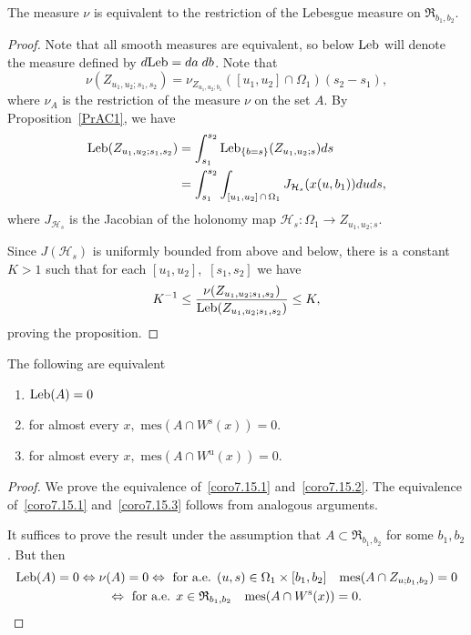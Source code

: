 \documentclass[AHL, Unicode, longabstracts,published]{cedram}
\newcommand{\inv}{^{-1}}
\newcommand{\unstable}{\text{u}}
\newcommand{\stable}{\text{s}}
\newcommand{\mes}{{\mathrm{mes}}}
\newcommand{\Rect}{{\mathfrak{R}}}
\newcommand{\hol}{\mathcal{H}}
\newcommand{\Ws}{W^{\stable}}
\newcommand{\Wu}{W^{\unstable}}
\newcommand{\Leb}{\textup{Leb}}
\newcommand*{\relabel}{\renewcommand{\labelenumi}{(\theenumi)}}
\newcommand*{\alphenumi}{\renewcommand*{\theenumi}{\alph{enumi}}\relabel}
\begin{document}
\begin{prop}\label{PrAC2}
The measure $\nu$ is equivalent to the restriction of the Lebesgue measure on $\Rect_{b_1, b_2}.$
\end{prop}
\begin{proof}
Note that all smooth measures are equivalent, so below $\Leb$ will denote the measure defined by $d\Leb=da\; db$. Note that
\[
\nu(Z_{u_1, u_2; s_1, s_2})= \nu_{Z_{u_{1},u_{2};b_{1}}}([u_1,
u_2]\cap \Omega_1) (s_2-s_1),
\]
where $\nu_{A}$ is the
restriction of the measure $\nu$ on the set $A$. By Proposition~\ref{PrAC1}, we have
\begin{align*}
\Leb(Z_{u_1,u_2; s_1, s_2}) &=\int _{s_1}^{s_2} \Leb_{\{b = s\}}(Z_{u_1, u_2; s}) ds\\
&=\int_{s_1}^{s_2} \int_{[u_1, u_2]\,\cap\,\Omega_1} J_{\hol_s}(x(u, b_1)) du ds,
\end{align*}
where $J_{\hol_s}$ is the Jacobian of the holonomy map $\hol_s: \Omega_1\to Z_{u_1, u_2; s}$.

Since $J(\hol_s)$ is uniformly bounded from above and below, there is a constant $K > 1$ such that for each $[u_1, u_2],$ $[s_1, s_2]$ we have
\begin{align*}
{K}\inv\leq \frac{\nu(Z_{u_1, u_2; s_1, s_2})}{ \Leb(Z_{u_1, u_2; s_1, s_2})}\leq K,
\end{align*}
proving the proposition.
\end{proof}
\begin{coro}\label{AC1-AC2}
The following are equivalent
\begin{enumerate}\alphenumi
\item\label{coro7.15.1} $\Leb(A)=0$
\item\label{coro7.15.2} for almost every $x,$ $\mes(A\cap \Ws(x))=0.$
\item\label{coro7.15.3} for almost every $x,$ $\mes(A\cap \Wu(x))=0.$
\end{enumerate}
\end{coro}
\begin{proof}
We prove the equivalence of~\eqref{coro7.15.1} and~\eqref{coro7.15.2}. The equivalence of~\eqref{coro7.15.1} and~\eqref{coro7.15.3} follows from analogous arguments.

It suffices to prove the result under the assumption that $A\subset \Rect_{b_1, b_2}$ for some $b_1, b_2$. But then
\begin{gather*}
\Leb(A)=0\Leftrightarrow \nu(A)=0
\Leftrightarrow \text{ for a.e. }(u, s) \in\Omega_1\times [b_1, b_2] \quad \mes(A\cap
Z_{u; b_1, b_2})=0
\\
\Leftrightarrow \text{ for a.e. }x\in \Rect_{b_1, b_2} \quad \mes(A\cap \Ws(x))=0. \qedhere
\end{gather*}
\end{proof}
\end{document}
